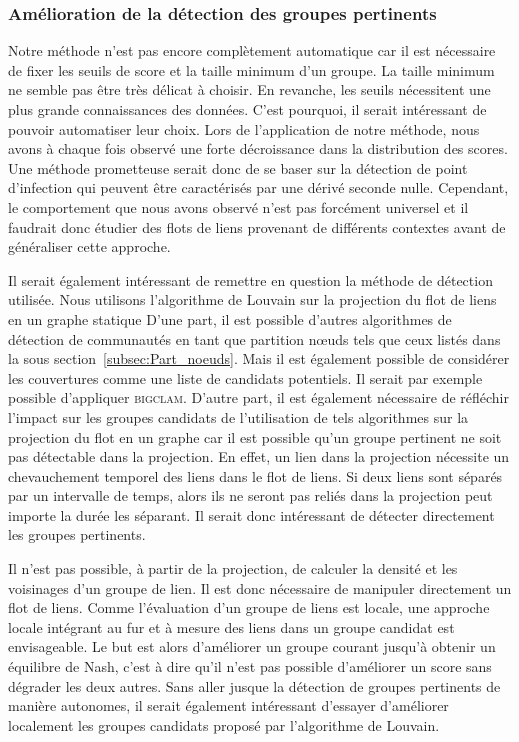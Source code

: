 \subsubsection{Amélioration de la détection des groupes pertinents}
Notre méthode n'est pas encore complètement automatique car il est nécessaire de fixer les seuils de score et la taille minimum d'un groupe.
La taille minimum ne semble pas être très délicat à choisir.
En revanche, les seuils nécessitent une plus grande connaissances des données.
C'est pourquoi, il serait intéressant de pouvoir automatiser leur choix.
Lors de l'application de notre méthode, nous avons à chaque fois observé une forte décroissance dans la distribution des scores.
Une méthode prometteuse serait donc de se baser sur la détection de point d'infection qui peuvent être caractérisés par une dérivé seconde nulle.
Cependant, le comportement que nous avons observé n'est pas forcément universel et il faudrait donc étudier des flots de liens provenant de différents contextes avant de généraliser cette approche.


Il serait également intéressant de remettre en question la méthode de détection utilisée.
Nous utilisons l'algorithme de Louvain sur la projection du flot de liens en un graphe statique
D'une part, il est possible d'autres algorithmes de détection de communautés en tant que partition n\oe uds tels que ceux listés dans la sous section~\ref{subsec:Part_noeuds}.
Mais il est également possible de considérer les couvertures comme une liste de candidats potentiels.
Il serait par exemple possible d'appliquer \textsc{bigclam}.
D'autre part, il est également nécessaire de réfléchir l'impact sur les groupes candidats de l'utilisation de tels algorithmes sur la projection du flot en un graphe car il est possible qu'un groupe pertinent ne soit pas détectable dans la projection.
En effet, un lien dans la projection nécessite un chevauchement temporel des liens dans le flot de liens.
Si deux liens sont séparés par un intervalle de temps, alors ils ne seront pas reliés dans la projection peut importe la durée les séparant.
Il serait donc intéressant de détecter directement les groupes pertinents.

Il n'est pas possible, à partir de la projection, de calculer la densité et les voisinages d'un groupe de lien.
Il est donc nécessaire de manipuler directement un flot de liens.
Comme l'évaluation d'un groupe de liens est locale, une approche locale intégrant au fur et à mesure des liens dans un groupe candidat est envisageable.
Le but est alors d'améliorer un groupe courant jusqu'à obtenir un équilibre de Nash, c'est à dire qu'il n'est pas possible d'améliorer un score sans dégrader les deux autres.
Sans aller jusque la détection de groupes pertinents de manière autonomes, il serait également intéressant d'essayer d'améliorer localement les groupes candidats proposé par l'algorithme de Louvain.


